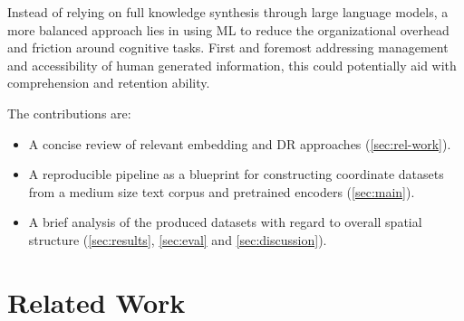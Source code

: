 Instead of relying on full knowledge synthesis through large language models, a more balanced approach lies in using ML to reduce the organizational overhead and friction around cognitive tasks. First and foremost addressing management and accessibility of human generated information, this could potentially aid with comprehension and retention ability.




The contributions are:
\begin{itemize}
    \item A concise review of relevant embedding and DR approaches (\autoref{sec:rel-work}).
    \item A reproducible pipeline as a blueprint for constructing coordinate datasets from a medium size text corpus and pretrained encoders (\autoref{sec:main}).
    \item A brief analysis of the produced datasets with regard to overall spatial structure (\autoref{sec:results}, \autoref{sec:eval} and \autoref{sec:discussion}).
\end{itemize}

\section{Related Work}
\label{sec:rel-work}

